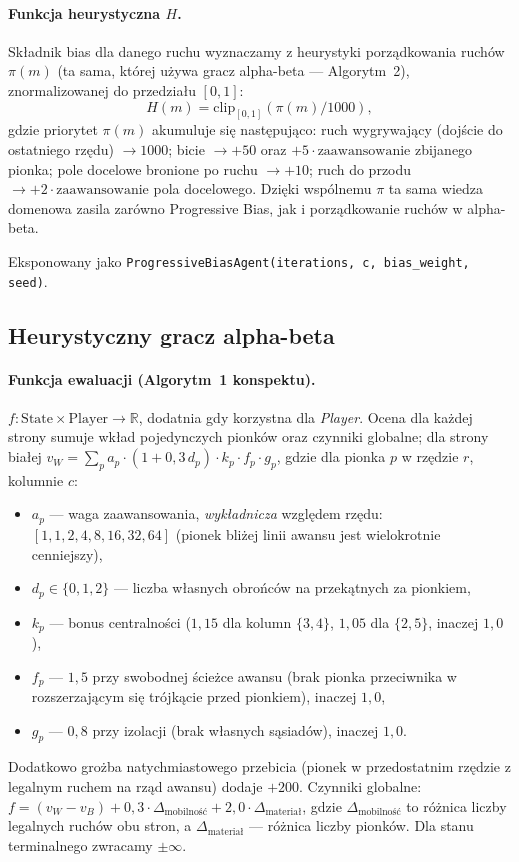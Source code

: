 \paragraph{Funkcja heurystyczna $H$.}
Składnik bias dla danego ruchu wyznaczamy z heurystyki porządkowania ruchów
$\pi(m)$ (ta sama, której używa gracz alpha-beta --- Algorytm~2), znormalizowanej
do przedziału $[0, 1]$:
\begin{equation}
H(m) = \mathrm{clip}_{[0,1]}\!\left( \pi(m) / 1000 \right),
\end{equation}
gdzie priorytet $\pi(m)$ akumuluje się następująco: ruch wygrywający (dojście
do ostatniego rzędu) $\to 1000$; bicie $\to +50$ oraz $+5\cdot\text{zaawansowanie}$
zbijanego pionka; pole docelowe bronione po ruchu $\to +10$; ruch do przodu
$\to +2\cdot\text{zaawansowanie}$ pola docelowego. Dzięki wspólnemu $\pi$ ta sama
wiedza domenowa zasila zarówno Progressive Bias, jak i porządkowanie ruchów
w alpha-beta.

Eksponowany jako \texttt{ProgressiveBiasAgent(iterations, c, bias\_weight, seed)}.

\subsection{Heurystyczny gracz alpha-beta}

\paragraph{Funkcja ewaluacji (Algorytm~1 konspektu).}
$f: \text{State} \times \text{Player} \to \mathbb{R}$, dodatnia gdy korzystna
dla \emph{Player}. Ocena dla każdej strony sumuje wkład pojedynczych pionków
oraz czynniki globalne; dla strony białej $v_W = \sum_p a_p \cdot (1 + 0{,}3\,d_p)
\cdot k_p \cdot f_p \cdot g_p$, gdzie dla pionka $p$ w rzędzie $r$, kolumnie $c$:
\begin{itemize}[nosep]
    \item $a_p$ --- waga zaawansowania, \emph{wykładnicza} względem rzędu:
          $[1, 1, 2, 4, 8, 16, 32, 64]$ (pionek bliżej linii awansu jest
          wielokrotnie cenniejszy),
    \item $d_p \in \{0,1,2\}$ --- liczba własnych obrońców na przekątnych za pionkiem,
    \item $k_p$ --- bonus centralności ($1{,}15$ dla kolumn $\{3,4\}$, $1{,}05$ dla $\{2,5\}$, inaczej $1{,}0$),
    \item $f_p$ --- $1{,}5$ przy swobodnej ścieżce awansu (brak pionka przeciwnika
          w rozszerzającym się trójkącie przed pionkiem), inaczej $1{,}0$,
    \item $g_p$ --- $0{,}8$ przy izolacji (brak własnych sąsiadów), inaczej $1{,}0$.
\end{itemize}
Dodatkowo grożba natychmiastowego przebicia (pionek w przedostatnim rzędzie
z legalnym ruchem na rząd awansu) dodaje $+200$. Czynniki globalne:
$f = (v_W - v_B) + 0{,}3 \cdot \Delta_{\text{mobilność}} + 2{,}0 \cdot \Delta_{\text{materiał}}$,
gdzie $\Delta_{\text{mobilność}}$ to różnica liczby legalnych ruchów obu stron,
a $\Delta_{\text{materiał}}$ --- różnica liczby pionków. Dla stanu terminalnego
zwracamy $\pm\infty$.

